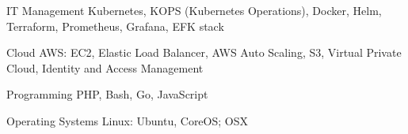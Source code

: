 


\begin{cvskills}


\cvskill
{IT Management} %
{Kubernetes, KOPS (Kubernetes Operations), Docker, Helm, Terraform, Prometheus, Grafana, EFK stack} %


\cvskill
{Cloud} %
{AWS: EC2, Elastic Load Balancer, AWS Auto Scaling, S3, Virtual Private Cloud, Identity and Access Management} %


\cvskill
{Programming} %
{PHP, Bash, Go, JavaScript} %


\cvskill
{Operating Systems} %
{Linux: Ubuntu, CoreOS; OSX}


\end{cvskills}
